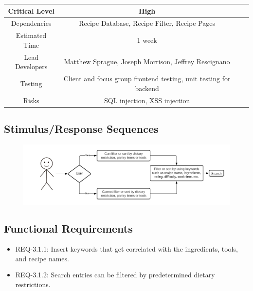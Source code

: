 \documentclass{scrreprt}
\begin{document}
\begin{center}
    \begin{tabular}{| c | c | c | c |}
        \hline
        Critical Level  & High                                                                 \\
        \hline
        Dependencies    & Recipe Database, Recipe Filter, Recipe Pages                         \\
        \hline
        Estimated Time  & 1 week                                                               \\
        \hline
        Lead Developers & Matthew Sprague, Joseph Morrison, Jeffrey Rescignano \\
        \hline
        Testing         & Client and focus group \gls{frontend} testing,
                          \gls{unit testing} for \gls{backend}                                 \\
        \hline
        Risks           & \gls{SQL injection}, \gls{XSS injection}                             \\
        \hline
    \end{tabular}
\end{center}

\subsection{Stimulus/Response Sequences}

\begin{figure}[H]\centering
    \includegraphics[width=\columnwidth]{FlowCharts/Search-Search.png}
\end{figure}

\subsection{\gls{Functional Requirements}}

\begin{itemize}
    \item REQ-3.1.1: Insert keywords that get correlated with the ingredients, tools, and recipe names.
    \item REQ-3.1.2: Search entries can be filtered by predetermined dietary restrictions.
\end{itemize}
\end{document}
